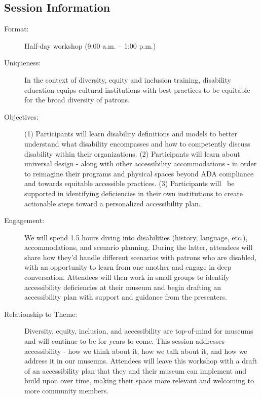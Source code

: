 \documentclass{report}
\begin{document}
              \subsection*{Session Information}
                \begin{description}
                  \item [Format:] Half-day workshop (9:00 a.m. – 1:00 p.m.)
							    
							    \item [Uniqueness:]In the context of diversity, equity and inclusion training, disability education equips cultural institutions with best practices to be equitable for the broad diversity of patrons.
							    \item [Objectives:](1) Participants will learn disability definitions and models to better understand what disability encompasses and how to competently discuss disability within their organizations. (2) Participants will learn about universal design - along with other accessibility accommodations - in order to reimagine their programs and physical spaces beyond ADA compliance and towards equitable accessible practices. (3) Participants will  be supported in identifying deficiencies in their own institutions to create actionable steps toward a personalized accessibility plan.
							    \item [Engagement:]We will spend 1.5 hours diving into disabilities (history, language, etc.), accommodations, and scenario planning. During the latter, attendees will share how they’d handle different scenarios with patrons who are disabled, with an opportunity to learn from one another and engage in deep conversation. Attendees will then work in small groups to identify accessibility deficiencies at their museum and begin drafting an accessibility plan with support and guidance from the presenters.
							    \item [Relationship to Theme:]Diversity, equity, inclusion, and accessibility are top-of-mind for museums and will continue to be for years to come. This session addresses accessibility - how we think about it, how we talk about it, and how we address it in our museums. Attendees will leave this workshop with a draft of an accessibility plan that they and their museum can implement and build upon over time, making their space more relevant and welcoming to more community members.
							    
                \end{description}
\end{document}
